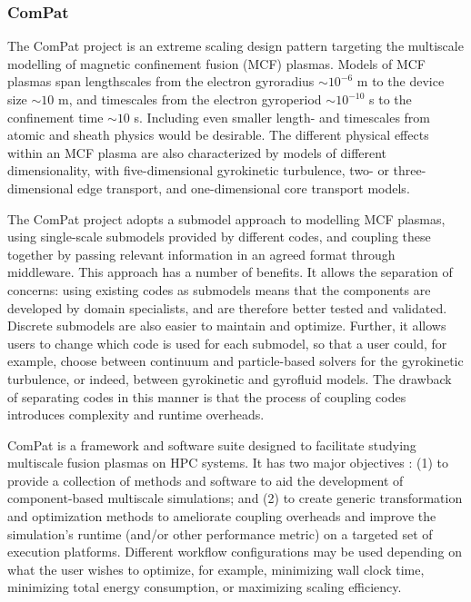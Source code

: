 
\subsubsection{ComPat}\label{sec:compat}

The ComPat project \cite{compatwebsite,compatswwebsite} is an extreme scaling
design pattern targeting the multiscale modelling of magnetic confinement
fusion (MCF) plasmas.  
Models of MCF plasmas span lengthscales from the electron gyroradius $\sim
10^{-6}$ m to the device size $\sim 10$ m, and timescales from the electron
gyroperiod $\sim 10^{-10}$ s to the confinement time $\sim 10$ s.
Including even smaller length- and timescales from atomic and sheath physics
would be desirable.  The different physical effects within an MCF plasma are
also characterized by models of different dimensionality, with five-dimensional
gyrokinetic turbulence, two- or three-dimensional edge transport, and
one-dimensional core transport models.

The ComPat project adopts a submodel approach to modelling MCF plasmas, using
single-scale submodels provided by different codes, and coupling these together
by passing relevant information in an agreed format through middleware.  
This approach has a number of benefits.  
It allows the separation of concerns: using existing codes as submodels means
that the components are developed by domain specialists, and are therefore
better tested and validated.  
Discrete submodels are also easier to maintain and optimize.  
Further, it allows users to change which code is used for each submodel, so
that a user could, for example, choose between continuum and particle-based
solvers for the gyrokinetic turbulence, or indeed, between gyrokinetic and
gyrofluid models.
The drawback of separating codes in this manner is that the process of coupling
codes introduces complexity and runtime overheads.

ComPat is a framework and software suite designed to facilitate studying
multiscale fusion plasmas on HPC systems.  
It has two major objectives \cite{Lu19ComP}:
(1) to provide a collection of methods and software to aid the development of
component-based multiscale simulations; and 
(2) to create generic transformation and optimization methods to ameliorate
coupling overheads and improve the simulation's runtime (and/or other
performance metric) on a targeted set of execution platforms.
Different workflow configurations may be used depending on what the user wishes
to optimize, for example, minimizing wall clock time, minimizing total energy
consumption, or maximizing scaling efficiency.


